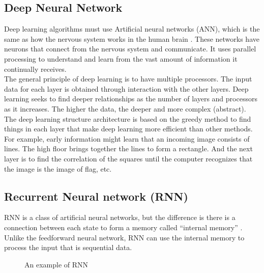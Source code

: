\documentclass[12pt,oneside,openright,a4paper]{cpe-english-project}
\begin{document}
\subsection{Deep Neural Network}
Deep learning algorithms must use Artificial neural networks (ANN), which is the same as how
the nervous system works in the human brain \cite{machine_learning_vs_deep_learning}. These networks have neurons that
connect from the nervous system and communicate. It uses parallel processing to understand and
learn from the vast amount of information it continually receives.\\
The general principle of deep learning is to have multiple processors. The input data for each
layer is obtained through interaction with the other layers. Deep learning seeks to find deeper
relationships as the number of layers and processors as it increases. The higher the data, the
deeper and more complex (abstract).\\
The deep learning structure architecture is based on the greedy method to find things in each
layer that make deep learning more efficient than other methods. For example, early information
might learn that an incoming image consists of lines. The high floor brings together the lines
to form a rectangle. And the next layer is to find the correlation of the squares until the
computer recognizes that the image is the image of flag, etc.

\subsection{Recurrent Neural network (RNN)}
RNN is a class of artificial neural networks, but the difference is there is a connection between
each state to form a memory called “internal memory” \cite{understand_rnn}. Unlike the feedforward
neural network, RNN can use the internal memory to process the input that is sequential data.

\begin{figure}[!h] \centering
  \setlength{\fboxrule}{0.2mm} %
  \setlength{\fboxsep}{0.5cm} %
  \caption{An example of RNN} %
  \label{fig:example_rnn} %
\end{figure}
\end{document}
